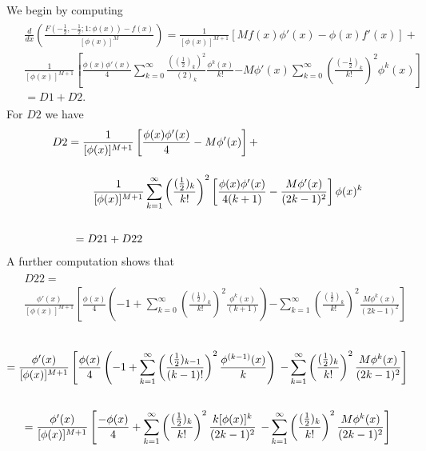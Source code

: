 \documentclass[12pt]{article}
\begin{document}
 
We begin by computing
\begin{align*}
\begin{split}
& 
\frac{d}{dx} (\frac{F(-\frac{1}{2}, -\frac{1}{2}; 
1:\phi(x))-f(x)}{[\phi(x)]^M}) = 
\frac{1}{[\phi(x)]^{M+1}} [Mf(x)\phi'(x)-\phi(x)f'(x)] +  \\[4ex]
&  
\frac{1}{[\phi(x)]^{M+1}}\left[\frac{\phi(x) \phi'(x)}{4} 
\sum_{k=0}^{\infty}
\frac{(( \frac{1}{2})_k)^2 }{(2)_k} \frac{\phi^k(x)}{k!} \right.  \left.-
M\phi'(x)\sum_{k=0}^{\infty}
\left(\frac{(  -\frac{1}{2}) _k }{k!}\right)^2 \phi^k(x)\right]  \\[4ex]
& = D1  + D2. 
\end{split}
\end{align*} 
For  $D2$ we have
\begin{align*}
\begin{split}
&  D2 =\frac{1}{[\phi(x)]^{M+1}}\left[\frac{\phi(x)\phi'(x) 
}{4}-M\phi'(x)\right] + \\[3ex]
& \hspace{.5in} \frac{1}{[\phi(x)]^{M+1}} \sum_{k=1}^{\infty} 
\left(\frac{(
\frac{1}{2})_k}{k!}\right)^2 
\left[\frac{\phi(x)\phi'(x)}{4(k+1)}-\frac{M\phi'(x)}{(2k-1)^2} \right]
\phi(x)^k\\[4ex] 
& \hspace{.25in} =D21+D22
\end{split}
\end{align*} 
A further computation shows that
\begin{align*}
\begin{split}
&  D22 =   \\[3ex] 
& \frac{\phi'(x)}{[\phi(x)]^{M+1}}\left[\frac{\phi(x)  }{4} \left(-1 + 
  \sum_{k=0}^{\infty} \left(\frac{(\frac{1}{2})_k}{k!}\right)^2 
\frac{\phi^k(x) }{(k+1)} \right) \right. 
\left.- \sum_{k=1}^{\infty} \left(\frac{(\frac{1}{2})_k}{k!}\right)^2 
\frac{M\phi^k(x)}{(2k-1)^2}  \right]
\end{split}
\end{align*} 
\begin{align*}
\begin{split}
&\hspace{-6in}\\  
= \frac{\phi'(x)}{[\phi(x)]^{M+1}} \left[ \frac{\phi(x) }{4} \left( -1+ 
   \sum_{k=1}^{\infty} \left( \frac{(\frac{1}{2})_{k-1}}{(k-1)!}\right)^2 
\frac{\phi^{(k-1)}(x) }{k} \right) \right. 
\left. - \sum_{k=1}^{\infty} \left(\frac{(\frac{1}{2})_k}{k!}\right)^2 
\frac{M \phi^k(x)}{(2k-1)^2}  \right]&
\end{split}
\end{align*}
\begin{align*}
\begin{split}
&\hspace{-6in}\\  
= \frac{\phi'(x)}{[\phi(x)]^{M+1}}\left [\frac{-\phi(x) }{4}+ 
   \sum_{k=1}^{\infty} \left(\frac{(\frac{1}{2})_{k}}{k!}\right)^2 
\frac{k[\phi(x)]^{k} }{(2k-1)^2}  \right. 
\left.- \sum_{k=1}^{\infty} \left(\frac{(\frac{1}{2})_k}{k!}\right)^2 
\frac{M\phi^k(x)}{(2k-1)^2}  \right]&
\end{split}
\end{align*} \\
\end{document}
